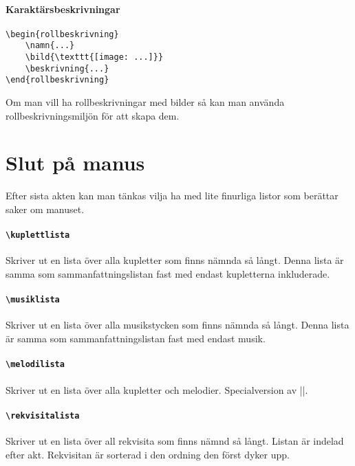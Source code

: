 \documentclass[a4paper,12pt]{article}
\begin{document}
\paragraph{Karaktärsbeskrivningar}
\begin{lstlisting}
\begin{rollbeskrivning}
	\namn{...}
	\bild{\texttt{[image: ...]}}
	\beskrivning{...}
\end{rollbeskrivning}
\end{lstlisting}
Om man vill ha rollbeskrivningar med bilder så kan man använda rollbeskrivningsmiljön för att skapa dem.


\section{Slut på manus}
\label{sec:slut-på-manus}
Efter sista akten kan man tänkas vilja ha med lite finurliga listor som berättar saker om manuset.

\paragraph{\tt\bfseries\textbackslash kuplettlista}
Skriver ut en lista över alla kupletter som finns nämnda så långt. Denna lista är samma som sammanfattningslistan fast med endast kupletterna inkluderade.

\paragraph{\tt\bfseries\textbackslash musiklista}
Skriver ut en lista över alla musikstycken som finns nämnda så långt. Denna lista är samma som sammanfattningslistan fast med endast musik.

\paragraph{\tt\bfseries\textbackslash melodilista}
Skriver ut en lista över alla kupletter och melodier. Specialversion av |\kuplettlista|.

\paragraph{\tt\bfseries\textbackslash rekvisitalista}
Skriver ut en lista över all rekvisita som finns nämnd så långt. Listan är indelad efter akt. Rekvisitan är sorterad i den ordning den först dyker upp.
\end{document}
